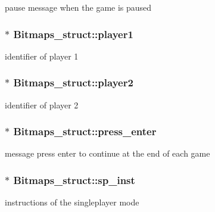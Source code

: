 pause message when the game is paused 

\subsubsection[{\texorpdfstring{player1}{player1}}]{$\ast$ Bitmaps\+\_\+struct\+::player1}\hypertarget{group__graphics_ga279ac50f42320cb39cbc02270e40597a}{}\label{group__graphics_ga279ac50f42320cb39cbc02270e40597a}


identifier of player 1 

\subsubsection[{\texorpdfstring{player2}{player2}}]{$\ast$ Bitmaps\+\_\+struct\+::player2}\hypertarget{group__graphics_gaaee24419ba914b7d473d1f5e06d84272}{}\label{group__graphics_gaaee24419ba914b7d473d1f5e06d84272}


identifier of player 2 

\subsubsection[{\texorpdfstring{press\+\_\+enter}{press_enter}}]{$\ast$ Bitmaps\+\_\+struct\+::press\+\_\+enter}\hypertarget{group__graphics_gaf891e78c1cd9b89f53a3cf6032f88e71}{}\label{group__graphics_gaf891e78c1cd9b89f53a3cf6032f88e71}


message press enter to continue at the end of each game 

\subsubsection[{\texorpdfstring{sp\+\_\+inst}{sp_inst}}]{$\ast$ Bitmaps\+\_\+struct\+::sp\+\_\+inst}\hypertarget{group__graphics_ga067f54df47f8ccad03f63d3b683f73a5}{}\label{group__graphics_ga067f54df47f8ccad03f63d3b683f73a5}


instructions of the singleplayer mode 

